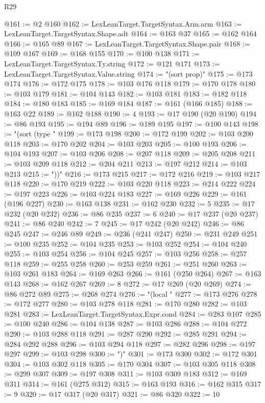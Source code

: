 \begin{lexlean}{R29}
\begin{coremodule}
@161 := @2 @160
@162 := LexLeanTarget.TargetSyntax.Arm.arm
@163 := LexLeanTarget.TargetSyntax.Shape.adt
@164 := @163 @37
@165 := @162 @164
@166 := @165 @89
@167 := LexLeanTarget.TargetSyntax.Shape.pair
@168 := @109 @167
@169 := @168 @155
@170 := @100 @138
@171 := LexLeanTarget.TargetSyntax.Ty.string
@172 := @121 @171
@173 := LexLeanTarget.TargetSyntax.Value.string
@174 := "(sort prop)"
@175 := @173 @174
@176 := @172 @175
@178 := @103 @176 @118
@179 := @170 @178
@180 := @103 @179
@181 := @104 @143
@182 := @103 @181
@183 := @182 @118
@184 := @180 @183
@185 := @169 @184
@187 := @161 (@166 @185)
@188 := @163 @22
@189 := @162 @188
@190 := 4
@193 := @17 @190 (@20 @190)
@194 := @86 @193
@195 := @194 @89
@196 := @189 @195
@197 := @100 @143
@198 := "(sort (type "
@199 := @173 @198
@200 := @172 @199
@202 := @103 @200 @118
@203 := @170 @202
@204 := @103 @203
@205 := @100 @193
@206 := @104 @193
@207 := @103 @206
@208 := @207 @118
@209 := @205 @208
@211 := @103 @209 @118
@212 := @204 @211
@213 := @197 @212
@214 := @103 @213
@215 := "))"
@216 := @173 @215
@217 := @172 @216
@219 := @103 @217 @118
@220 := @170 @219
@222 := @103 @220 @118
@223 := @214 @222
@224 := @197 @223
@226 := @103 @224 @183
@227 := @169 @226
@229 := @161 (@196 @227)
@230 := @163 @138
@231 := @162 @230
@232 := 5
@235 := @17 @232 (@20 @232)
@236 := @86 @235
@237 := 6
@240 := @17 @237 (@20 @237)
@241 := @86 @240
@242 := 7
@245 := @17 @242 (@20 @242)
@246 := @86 @245
@247 := @246 @89
@249 := @236 (@241 @247)
@250 := @231 @249
@251 := @100 @235
@252 := @104 @235
@253 := @103 @252
@254 := @104 @240
@255 := @103 @254
@256 := @104 @245
@257 := @103 @256
@258 := @257 @118
@259 := @255 @258
@260 := @253 @259
@261 := @251 @260
@263 := @103 @261 @183
@264 := @169 @263
@266 := @161 (@250 @264)
@267 := @163 @143
@268 := @162 @267
@269 := 8
@272 := @17 @269 (@20 @269)
@274 := @86 @272 @89
@275 := @268 @274
@276 := "(local "
@277 := @173 @276
@278 := @172 @277
@280 := @103 @278 @118
@281 := @170 @280
@282 := @103 @281
@283 := LexLeanTarget.TargetSyntax.Expr.cond
@284 := @283 @107
@285 := @100 @240
@286 := @104 @138
@287 := @103 @286
@288 := @104 @272
@290 := @103 @288 @118
@291 := @287 @290
@292 := @285 @291
@294 := @284 @292 @288
@296 := @103 @294 @118
@297 := @282 @296
@298 := @197 @297
@299 := @103 @298
@300 := ")"
@301 := @173 @300
@302 := @172 @301
@304 := @103 @302 @118
@305 := @170 @304
@307 := @103 @305 @118
@308 := @299 @307
@309 := @197 @308
@311 := @103 @309 @183
@312 := @169 @311
@314 := @161 (@275 @312)
@315 := @163 @193
@316 := @162 @315
@317 := 9
@320 := @17 @317 (@20 @317)
@321 := @86 @320
@322 := 10

\end{coremodule}
\end{lexlean}
